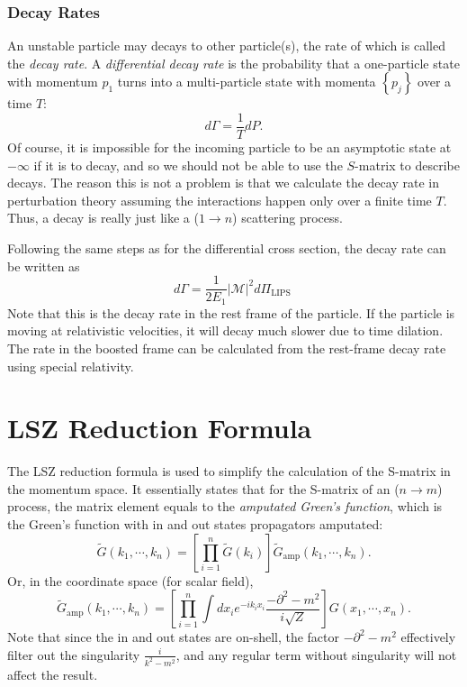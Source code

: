 \subsubsection{Decay Rates}
An unstable particle may decays to other particle(s), the rate of which is called the \textit{decay rate}.
A \textit{differential decay rate} is the probability that a one-particle state with momentum $p_{1}$ turns into a multi-particle state with momenta $\left\{p_{j}\right\}$ over a time $T$:
\begin{equation}
	d \Gamma=\frac{1}{T} d P .
\end{equation}
Of course, it is impossible for the incoming particle to be an asymptotic state at $-\infty$ if it is to decay, and so we should not be able to use the $S$-matrix to describe decays. 
The reason this is not a problem is that we calculate the decay rate in perturbation theory assuming the interactions happen only over a finite time $T$. 
Thus, a decay is really just like a ($1 \rightarrow n$) scattering process.

Following the same steps as for the differential cross section, the decay rate can be written as
\begin{equation}
	d \Gamma=\frac{1}{2 E_{1}}|\mathcal{M}|^{2} d \Pi_{\text {LIPS }}
\end{equation}
Note that this is the decay rate in the rest frame of the particle. 
If the particle is moving at relativistic velocities, it will decay much slower due to time dilation. 
The rate in the boosted frame can be calculated from the rest-frame decay rate using special relativity.





\section{LSZ Reduction Formula}

The LSZ reduction formula is used to simplify the calculation of the S-matrix in the momentum space.
It essentially states that for the S-matrix of an ($n \rightarrow m$) process, the matrix element equals to the \textit{amputated Green's function}, which is the Green's function with in and out states propagators amputated:
\begin{equation}
	\tilde{G}(k_1,\cdots,k_n) = \left[\prod_{i=1}^n \tilde{G}(k_i) \right] \tilde{G}_{\mathrm{amp}}(k_1,\cdots,k_n).
\end{equation}
Or, in the coordinate space (for scalar field), 
\begin{equation}
	\tilde{G}_{\mathrm{amp}}(k_1,\cdots,k_n) = \left[\prod_{i=1}^n \int d x_i e^{-i k_i x_i} \frac{-\partial^2-m^2}{i\sqrt Z} \right] G(x_1,\cdots,x_n).
\end{equation}
Note that since the in and out states are on-shell, the factor $-\partial^2-m^2$ effectively filter out the singularity $\frac{i}{k^2-m^2}$, and any regular term without singularity will not affect the result.

